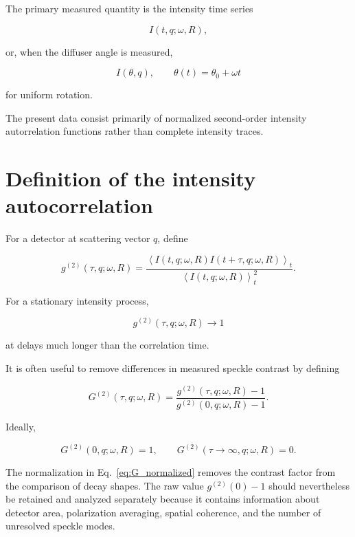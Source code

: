 \documentclass[11pt,letterpaper]{article}
\newcommand{\gtt}{g^{(2)}}
\newcommand{\Gnorm}{G^{(2)}}
\newcommand{\avg}[1]{\left\langle #1 \right\rangle}
\begin{document}
The primary measured quantity is the intensity time series

\begin{equation}
    I(t,q;\omega,R),
\end{equation}

or, when the diffuser angle is measured,

\begin{equation}
    I(\theta,q),
    \qquad
    \theta(t)=\theta_0+\omega t
\end{equation}

for uniform rotation.

The present data consist primarily of normalized second-order intensity
autorrelation functions rather than complete intensity traces.

\section{Definition of the intensity autocorrelation}

For a detector at scattering vector $q$, define

\begin{equation}
    \gtt(\tau,q;\omega,R)
    =
    \frac{
    \avg{
    I(t,q;\omega,R)
    I(t+\tau,q;\omega,R)
    }_t
    }{
    \avg{I(t,q;\omega,R)}_t^2
    }.
    \label{eq:g2_definition}
\end{equation}

For a stationary intensity process,

\begin{equation}
    \gtt(\tau,q;\omega,R)
    \rightarrow 1
\end{equation}

at delays much longer than the correlation time.

It is often useful to remove differences in measured speckle contrast by
defining

\begin{equation}
    \boxed{
    \Gnorm(\tau,q;\omega,R)
    =
    \frac{
    \gtt(\tau,q;\omega,R)-1
    }{
    \gtt(0,q;\omega,R)-1
    }.
    }
    \label{eq:G_normalized}
\end{equation}

Ideally,

\begin{equation}
    \Gnorm(0,q;\omega,R)=1,
    \qquad
    \Gnorm(\tau\rightarrow\infty,q;\omega,R)=0.
\end{equation}

The normalization in Eq.~\eqref{eq:G_normalized} removes the contrast
factor from the comparison of decay shapes. The raw value
$\gtt(0)-1$ should nevertheless be retained and analyzed separately because
it contains information about detector area, polarization averaging,
spatial coherence, and the number of unresolved speckle modes.
\end{document}
